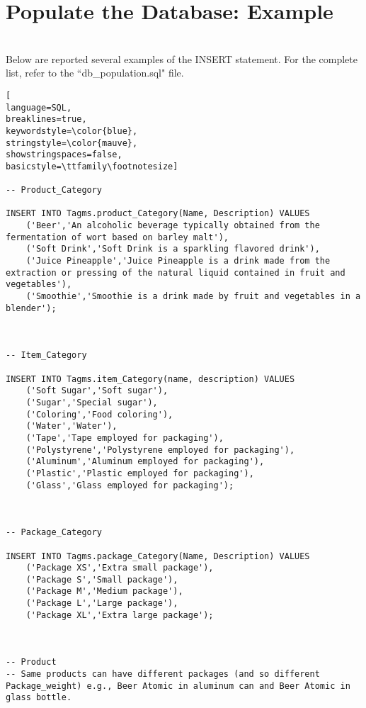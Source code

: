 
\section{Populate the Database: Example}
\\
Below are reported several examples of the INSERT statement. For the complete list, refer to the ``db\_population.sql" file.


\begin{lstlisting}[
language=SQL,
breaklines=true,
keywordstyle=\color{blue},
stringstyle=\color{mauve},
showstringspaces=false,
basicstyle=\ttfamily\footnotesize]

-- Product_Category

INSERT INTO Tagms.product_Category(Name, Description) VALUES
    ('Beer','An alcoholic beverage typically obtained from the fermentation of wort based on barley malt'),
    ('Soft Drink','Soft Drink is a sparkling flavored drink'),
    ('Juice Pineapple','Juice Pineapple is a drink made from the extraction or pressing of the natural liquid contained in fruit and vegetables'),
    ('Smoothie','Smoothie is a drink made by fruit and vegetables in a blender');



-- Item_Category

INSERT INTO Tagms.item_Category(name, description) VALUES
    ('Soft Sugar','Soft sugar'),
    ('Sugar','Special sugar'),
    ('Coloring','Food coloring'),
    ('Water','Water'),
    ('Tape','Tape employed for packaging'),
    ('Polystyrene','Polystyrene employed for packaging'),
    ('Aluminum','Aluminum employed for packaging'),
    ('Plastic','Plastic employed for packaging'),
    ('Glass','Glass employed for packaging');



-- Package_Category

INSERT INTO Tagms.package_Category(Name, Description) VALUES
    ('Package XS','Extra small package'),
    ('Package S','Small package'),
    ('Package M','Medium package'),
    ('Package L','Large package'),
    ('Package XL','Extra large package');



-- Product
-- Same products can have different packages (and so different Package_weight) e.g., Beer Atomic in aluminum can and Beer Atomic in glass bottle.


\end{lstlisting}
